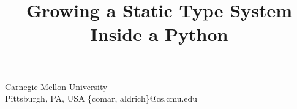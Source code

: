 \documentclass{sigplanconf}
\begin{document}

\title{{Growing} a Static Type System Inside a Python}


          {          Carnegie Mellon University\\
          Pittsburgh, PA, USA}
          {\{comar, aldrich\}@cs.cmu.edu\vspace{-10px}}   
\end{document}
